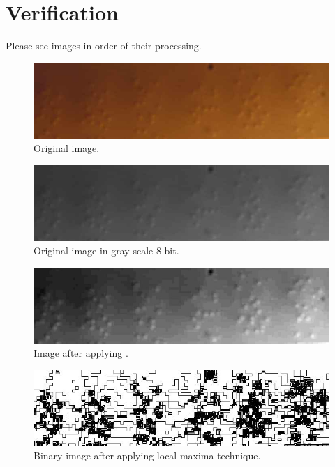 \documentclass[letterpaper]{article}
\begin{document}
\section{Verification}
Please see images in order of their processing.
\begin{figure}[!htbp]
	\centering
	\includegraphics[totalheight=3cm]{./images/Image1.jpg}
	\caption{Original image.}
	\label{fig:origImage}
\end{figure}
\begin{figure}[!htbp]
	\centering
	\includegraphics[totalheight=3cm]{./images/01_Gray8bit.jpg}
	\caption{Original image in gray scale 8-bit.}
	\label{fig:origImageGray}
\end{figure}
\begin{figure}[!htbp]
	\centering
	\includegraphics[totalheight=3cm]{./images/02_maxFlt.jpg}
	\caption{Image after applying .}
	\label{fig:maxFltImage}
\end{figure}
\begin{figure}[!htbp]
	\centering
	\includegraphics[totalheight=3cm]{./images/03_LocalMax.jpg}
	\caption{Binary image after applying local maxima technique.}
	\label{fig:localMaxImage}
\end{figure}
\end{document}
